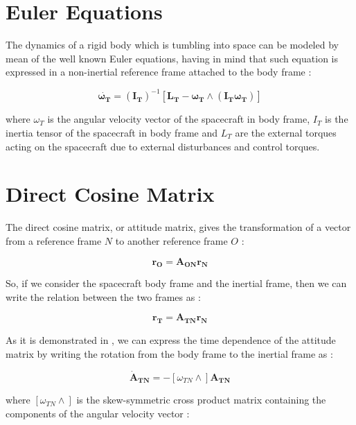 \section{Euler Equations}

The dynamics of a rigid body which is tumbling into space can be modeled by mean of the well known Euler equations, having in mind that such equation is expressed in a non-inertial reference frame attached to the body frame :

\begin{equation}
  \dot{\mathbf{\omega_T}} = \mathbf{(I_T)}^{-1} \left[\mathbf{L_T} - \mathbf{\omega_T}  \wedge (\mathbf{I_T} \mathbf{\omega_T})\right]
\end{equation}

where \textbf{$\omega_T$} is the angular velocity vector of the spacecraft in body frame, \textbf{$I_T$} is the inertia tensor of the spacecraft in body frame and \textbf{$L_T$} are the external torques acting on the spacecraft due to  external disturbances and control torques.

\section{Direct Cosine Matrix}
The direct cosine matrix, or attitude matrix, gives the transformation of a vector from a reference frame $N$ to another reference frame $O$ :

\begin{equation}
  \mathbf{r_{O}} = \mathbf{A_{ON}} \mathbf{r_{N}}
\end{equation}

So, if we consider the spacecraft body frame and the inertial frame, then we can write the relation between the two frames as :

\begin{equation}
  \mathbf{r_{T}} = \mathbf{A_{TN}} \mathbf{r_{N}}
\end{equation}

As it is demonstrated in \cite{Markley2014}, we can express the time dependence of the attitude matrix by writing the rotation from the body frame to the inertial frame as :

\begin{equation}
  \mathbf{\dot{A}_{TN}}= - [\omega_{TN} \wedge]\mathbf{A_{TN}}
\end{equation}

where $[\omega_{TN} \wedge]$ is the skew-symmetric cross product matrix containing the components of the angular velocity vector :

